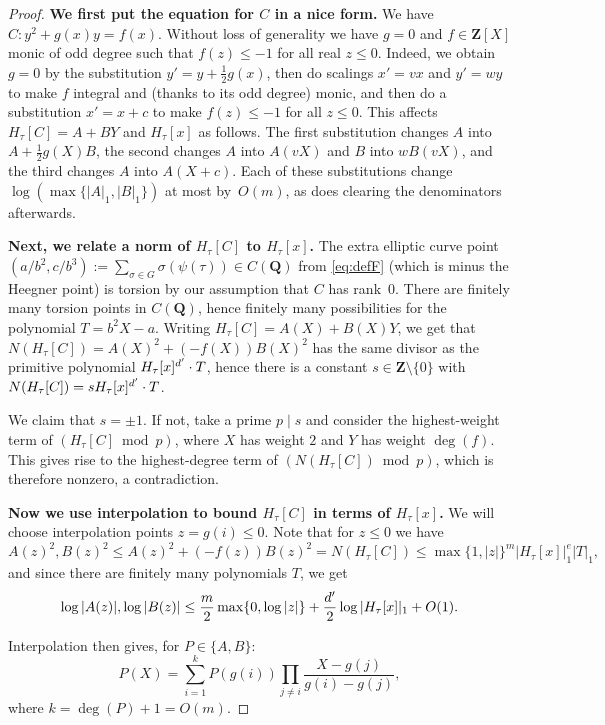 \documentclass{amsart}
\newcommand{\QQ}{\mathbf{Q}}
\newcommand{\ZZ}{\mathbf{Z}}
\newcommand{\F}{H_\tau[\curve]}
\newcommand{\Fx}{H_\tau[x]}
\newcommand{\curve}{C}
\numberwithin{equation}{section}
\theoremstyle{definition}
\begin{document}
\begin{proof}
	\textbf{We first put the equation for $C$ in a nice form.}
	We have $C : y^2 + g(x)y = f(x)$.
    Without loss of generality we have $g=0$ and $f\in\ZZ[X]$ monic of odd degree
    such that $f(z)\leq -1$ for all real $z\leq 0$.
    Indeed, we obtain $g=0$ by the substitution $y' = y+\frac{1}{2}g(x)$,
    then do scalings $x' = vx$ and $y'=wy$ to make $f$ integral and (thanks to its odd degree) monic,
    and then do a substitution $x' = x+c$ to make $f(z)\leq -1$ for all $z\leq 0$.
    This affects $\F=A+BY$ and $\Fx$ as follows.
    The first substitution changes $A$ into $A+\frac{1}{2} g(X)B$,
    the second changes $A$ into $A(vX)$ and $B$ into $wB(vX)$,
    and the third changes $A$ into $A(X+c)$.
    Each of these substitutions change $\log(\max\{|A|_1,|B|_1\})$
    at most by~$O(m)$, as does clearing the denominators afterwards.
	
	\textbf{Next, we relate a norm of $\F$ to $\Fx$.} The extra elliptic curve point
	$(a/b^2,c/b^3) := \sum_{\sigma\in G} \sigma(\psi(\tau))\in C(\QQ)$
	from \eqref{eq:defF} (which is minus the Heegner point)
	is torsion by our assumption that 
	$\curve$ has rank~$0$.
	There are finitely many torsion points in $\curve(\QQ)$,
	hence finitely many possibilities for the polynomial
	$T = b^2X-a$.
	Writing $\F = A(X) + B(X)Y$, we get that $N(\F) = A(X)^2 + (-f(X))B(X)^2$
	has the same divisor as the primitive polynomial
	$\Fx^\wase\cdot T$,
	hence there is a constant $s\in\ZZ\setminus \{0\}$
	with $N(\F) = s \Fx^\wase\cdot T$.
	
	We claim that $s = \pm 1$.
	If not, take a prime $p\mid s$ and consider the highest-weight term of
	$(\F\bmod p)$, where $X$ has weight $2$ and $Y$ has weight $\deg(f)$.
	This gives rise to the highest-degree term of $(N(\F)\bmod p)$, which is therefore
	nonzero, a contradiction.
	
	\textbf{Now we use interpolation to bound $\F$ in terms of $\Fx$.}
	We will choose interpolation points $z= g(i) \leq 0$. Note that
	for $z\leq 0$ we have
	$$A(z)^2, B(z)^2 \leq A(z)^2 + (- f(z))B(z)^2 = N(\F)
	\leq \max\{1,|z|\}^m |\Fx|^e_1 |T|_1,$$
	and since there are finitely many polynomials $T$, we get
	$$\log|A(z)|, \log|B(z)| \leq \frac{m}{2} \max\{0,\log|z|\} + \frac{\wase}{2} \log|\Fx|_1 + O(1).$$
	
	Interpolation then gives, for $P \in\{A,B\}$:
	\begin{equation}\label{eq:interpolation}
	P(X) = \sum_{i=1}^{k} P(g(i)) \prod_{j\not=i} \frac{X-g(j)}{g(i)-g(j)},
	\end{equation}
    where $k = \deg(P)+1 = O(m)$.
	

\end{proof}
\end{document}
